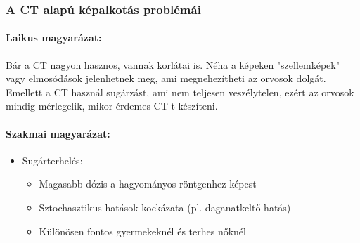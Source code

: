 \documentclass[a4paper,12pt]{article}
\begin{document}
\subsubsection{A CT alapú képalkotás problémái}

\paragraph{Laikus magyarázat:} Bár a CT nagyon hasznos, vannak korlátai is. Néha a képeken "szellemképek" vagy elmosódások jelenhetnek meg, ami megnehezítheti az orvosok dolgát. Emellett a CT használ sugárzást, ami nem teljesen veszélytelen, ezért az orvosok mindig mérlegelik, mikor érdemes CT-t készíteni.

\paragraph{Szakmai magyarázat:} \begin{itemize} \item Sugárterhelés: \begin{itemize} \item Magasabb dózis a hagyományos röntgenhez képest \item Sztochasztikus hatások kockázata (pl. daganatkeltő hatás) \item Különösen fontos gyermekeknél és terhes nőknél \end{itemize}


\end{itemize}
\end{document}
